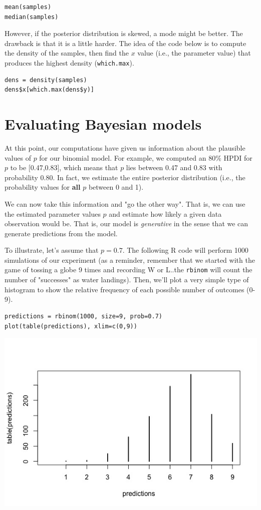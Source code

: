 \documentclass[11pt]{article}
\begin{document}
\begin{verbatim}
mean(samples)
median(samples)
\end{verbatim}

However, if the posterior distribution is skewed, a mode might be better.  The drawback is that it is a little harder.  The idea of the code below is to compute the density of the samples, then find the $x$ value (i.e., the parameter value) that produces the highest density (\texttt{which.max}).

\begin{verbatim}
dens = density(samples)
dens$x[which.max(dens$y)]
\end{verbatim}



\section*{Evaluating Bayesian models}
\label{sec-3}
At this point, our computations have given us information about the plausible values of $p$ for our binomial model.  For example, we computed an 80\% HPDI for $p$ to be [0.47,0.83], which means that $p$ lies between 0.47 and 0.83 with probability 0.80.  In fact, we estimate the entire posterior distribution (i.e., the probability values for \textbf{all} $p$ between 0 and 1).

We can now take this information and "go the other way".  That is, we can use the estimated parameter values $p$ and estimate how likely a given data observation would be.  That is, our model is \emph{generative} in the sense that we can generate predictions from the model.

To illustrate, let's assume that $p=0.7$.  The following R code will perform 1000 simulations of our experiment (as a reminder, remember that we started with the game of tossing a globe 9 times and recording W or L..the \texttt{rbinom} will count the number of "successes" as water landings). Then, we'll plot a very simple type of histogram to show the relative frequency of each possible number of outcomes (0-9).

\begin{verbatim}
predictions = rbinom(1000, size=9, prob=0.7)
plot(table(predictions), xlim=c(0,9))
\end{verbatim}

\includegraphics[width=.9\linewidth]{figures/week9/predict1.jpeg}
\end{document}
